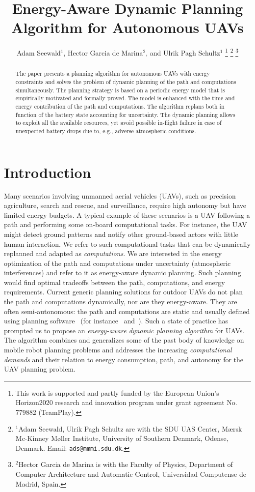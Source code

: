 \documentclass[letterpaper,10pt,conference]{ieeeconf}
\title{\LARGE \bf
Energy-Aware Dynamic Planning Algorithm for Autonomous UAVs
}
\author{
  Adam Seewald$^{1}$, Hector Garcia de Marina$^{2}$, and Ulrik Pagh Schultz$^{1}$
  \thanks{This work is supported and partly funded by the European Union's Horizon2020 research and innovation program under grant agreement No. 779882 (TeamPlay).
  }
  \thanks{$^{1}$Adam Seewald, Ulrik Pagh Schultz are with the SDU UAS Center, M{\ae}rsk Mc-Kinney M{\o}ller Institute, University of Southern Denmark, Odense, Denmark. Email: {\tt\small ads@mmmi.sdu.dk}.}
  \thanks{$^{2}$Hector Garcia de Marina is with the Faculty of Physics, Department of Computer Architecture and Automatic Control, Universidad Computense de Madrid, Spain.}
}
\theoremstyle{definition}
\begin{document}
\maketitle

\thispagestyle{empty}
\pagestyle{empty}

\begin{abstract}
  The paper presents a planning algorithm for autonomous UAVs with energy constraints and solves the problem of dynamic planning of the path and computations simultaneously. The planning strategy is based on a periodic energy model that is empirically motivated and formally proved. The model is enhanced with the time and energy contribution of the path and computations. The algorithm replans both in function of the battery state accounting for uncertainty. The dynamic planning allows to exploit all the available resources, yet avoid possible in-flight failure in case of unexpected battery drops due to, e.g., adverse atmospheric conditions.
\end{abstract}

%
\IEEEpeerreviewmaketitle


\section{Introduction}  %
\label{sec:intro}       %
Many scenarios involving unmanned aerial vehicles (UAVs), such as precision agriculture, search and rescue, and surveillance, require high autonomy but have limited energy budgets. A typical example of these scenarios is a UAV following a path and performing some on-board computational tasks. For instance, the UAV might detect ground patterns and notify other ground-based actors with little human interaction. We refer to such computational tasks that can be dynamically replanned and adapted as \emph{computations}. We are interested in the energy optimization of the path and computations under uncertainty (atmospheric interferences) and refer to it as energy-aware dynamic planning. Such planning would find optimal tradeoffs between the path, computations, and energy requirements. Current generic planning solutions for outdoor UAVs do not plan the path and computations dynamically, nor are they energy-aware. They are often semi-autonomous: the path and computations are static and usually defined using planning software~\cite{daponte2019review} (for instance~\cite{papa} and~\cite{px4}). Such a state of practice has prompted us to propose an \emph{energy-aware dynamic planning algorithm} for UAVs. The algorithm combines and generalizes some of the past body of knowledge on mobile robot planning problems and addresses the increasing \emph{computational demands} and their relation to energy consumption, path, and autonomy for the UAV planning problem.
\end{document}

